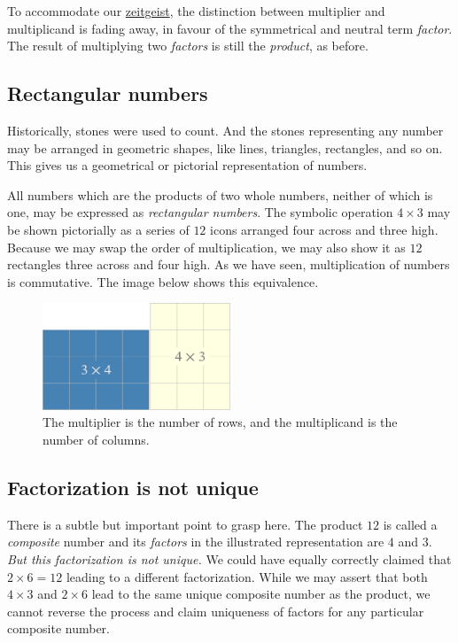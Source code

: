 \documentclass[
  a4paper,
]{article}
\begin{document}
To accommodate our
\href{https://www.thefreedictionary.com/zeitgeist}{zeitgeist}, the
distinction between multiplier and multiplicand is fading away, in
favour of the symmetrical and neutral term \emph{factor}. The result of
multiplying two \emph{factors} is still the \emph{product}, as before.

\hypertarget{rectangular-numbers}{%
\subsection{Rectangular numbers}\label{rectangular-numbers}}

Historically, stones were used to count. And the stones representing any
number may be arranged in geometric shapes, like lines, triangles,
rectangles, and so on. This gives us a geometrical or pictorial
representation of numbers.

All numbers which are the products of two whole numbers, neither of
which is one, may be expressed as \emph{rectangular numbers}. The
symbolic operation \(4 \times 3\) may be shown pictorially as a series
of \(12\) icons arranged four across and three high. Because we may swap
the order of multiplication, we may also show it as \(12\) rectangles
three across and four high. As we have seen, multiplication of numbers
is commutative. The image below shows this equivalence.

\begin{figure}
\hypertarget{fig:four-by-three}{%
\centering
\includegraphics[width=0.5\textwidth,height=\textheight]{images/four-by-three.png}
\caption{The multiplier is the number of rows, and the multiplicand is
the number of columns.}\label{fig:four-by-three}
}
\end{figure}

\hypertarget{factorization-is-not-unique}{%
\subsection{Factorization is not
unique}\label{factorization-is-not-unique}}

There is a subtle but important point to grasp here. The product \(12\)
is called a \emph{composite} number and its \emph{factors} in the
illustrated representation are \(4\) and \(3\). \emph{But this
factorization is not unique.} We could have equally correctly claimed
that \(2 \times 6 = 12\) leading to a different factorization. While we
may assert that both \(4 \times 3\) and \(2 \times 6\) lead to the same
unique composite number as the product, we cannot reverse the process
and claim uniqueness of factors for any particular composite number.
\end{document}
